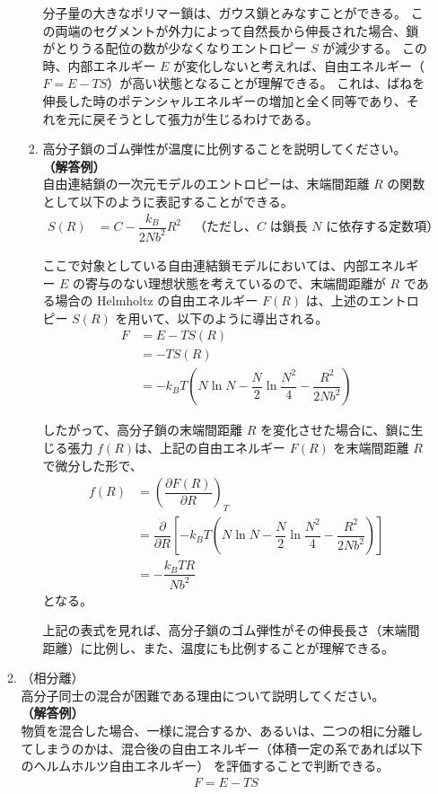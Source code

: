 \documentclass[uplatex,dvipdfmx,a4paper,11pt, titlepage]{jsarticle}
\begin{document}
\begin{itemize}
\begin{enumerate}
\begin{enumerate}
		分子量の大きなポリマー鎖は、ガウス鎖とみなすことができる。
		この両端のセグメントが外力によって自然長から伸長された場合、鎖がとりうる配位の数が少なくなりエントロピー $S$ が減少する。
		この時、内部エネルギー $E$ が変化しないと考えれば、自由エネルギー（$F=E-TS$）が高い状態となることが理解できる。
		これは、ばねを伸長した時のポテンシャルエネルギーの増加と全く同等であり、それを元に戻そうとして張力が生じるわけである。

		\item
		\label{it:5-2}
		高分子鎖のゴム弾性が温度に比例することを説明してください。\\
		{\bf（解答例）}\\
		自由連結鎖の一次元モデルのエントロピーは、末端間距離 $R$ の関数として以下のように表記することができる。
		\begin{align*}
		S(R)
			&= C -\dfrac{ k_B}{2Nb^2}R^2 \quad \text{（ただし、$C$ は鎖長 $N$ に依存する定数項）}
		\end{align*}

		ここで対象としている自由連結鎖モデルにおいては、内部エネルギー $E$ の寄与のない理想状態を考えているので、末端間距離が $R$ である場合の 
		Helmholtz の自由エネルギー 	$F(R)$ は、上述のエントロピー $S(R)$ を用いて、以下のように導出される。
		\begin{align*}
		F 	&= E - TS(R) \\
			&= -TS(R) \\
			&= -k_B T \left( N\ln N - \dfrac{N}{2} \ln \dfrac{N^2}{4} - \dfrac{R^2}{2Nb^2} \right) 
		\end{align*}

		したがって、高分子鎖の末端間距離 $R$ を変化させた場合に、鎖に生じる張力 $f(R)$は、上記の自由エネルギー $F(R)$ を末端間距離 $R$ で微分した形で、
		\begin{align*}
		f(R) 	
		&= \left(\dfrac{\partial F(R)}{\partial R} \right)_T \\
			&=\dfrac{\partial}{\partial R} \left[ -k_B T \left( N\ln N - \dfrac{N}{2} \ln \dfrac{N^2}{4} - \dfrac{R^2}{2Nb^2} \right) \right]\\
			&=- \dfrac{k_B T R}{Nb^2}
		\end{align*}
		となる。

		上記の表式を見れば、高分子鎖のゴム弾性がその伸長長さ（末端間距離）に比例し、また、温度にも比例することが理解できる。

		\end{enumerate}
	\item
	（相分離）\\
	\label{it:5-3}
	高分子同士の混合が困難である理由について説明してください。\\
	{\bf（解答例）}\\
	物質を混合した場合、一様に混合するか、あるいは、二つの相に分離してしまうのかは、混合後の自由エネルギー（体積一定の系であれば以下のヘルムホルツ自由エネルギー）
	を評価することで判断できる。
	\begin{align*}
	F=E-TS
	\end{align*}


\end{enumerate}
\end{itemize}
\end{document}
